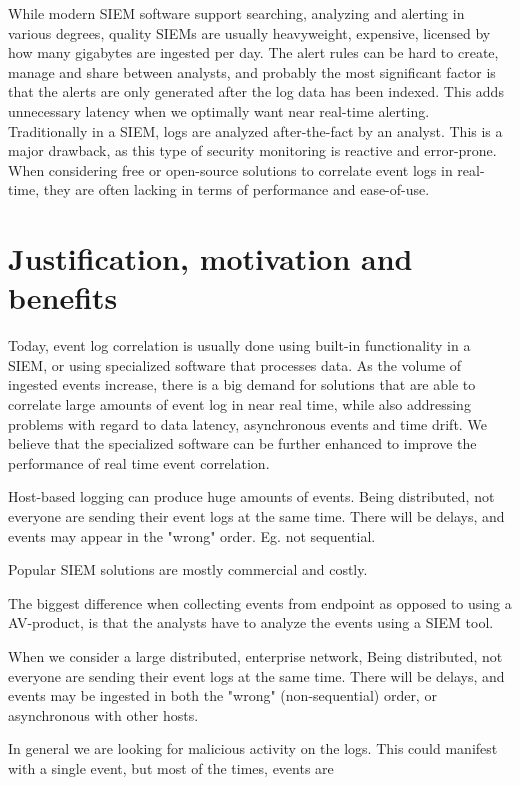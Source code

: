 While modern SIEM software support searching, analyzing and alerting in various degrees, quality SIEMs are usually heavyweight, expensive, licensed by how many gigabytes are ingested per day. The alert rules can be hard to create, manage and share between analysts, and probably the most significant factor is that the alerts are only generated after the log data has been indexed. This adds unnecessary latency when we optimally want near real-time alerting. Traditionally in a SIEM, logs are analyzed after-the-fact by an analyst. This is a major drawback, as this type of security monitoring is reactive and error-prone.
When considering free or open-source solutions to correlate event logs in real-time, they are often lacking in terms of performance and ease-of-use. 

\section{Justification, motivation and benefits}
\label{sec:motivation}
Today, event log correlation is usually done using built-in functionality in a SIEM, or using specialized software that processes data.
As the volume of ingested events increase, there is a big demand for solutions that are able to correlate large amounts of event log in near real time, while also addressing problems with regard to data latency, asynchronous events and time drift.
We believe that the specialized software can be further enhanced to improve the performance of real time event correlation.



Host-based logging can produce huge amounts of events.
Being distributed, not everyone are sending their event logs at the same time. There will be delays, and events may appear in the "wrong" order. Eg. not sequential.

Popular SIEM solutions are mostly commercial and costly.

The biggest difference when collecting events from endpoint as opposed to using a AV-product, is that the analysts have to analyze the events using a SIEM tool.

When we consider a large distributed, enterprise network, 
Being distributed, not everyone are sending their event logs at the same time. There will be delays, and events may be ingested in both the "wrong" (non-sequential) order, or asynchronous with other hosts.

In general we are looking for malicious activity on the logs. This could manifest with a single event, but most of the times, events are

